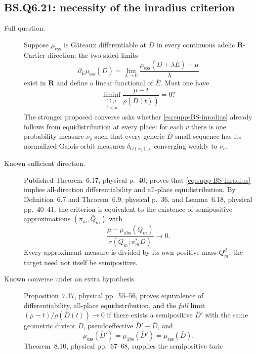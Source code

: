 \documentclass[11pt,a4paper]{article}
\theoremstyle{definition}
\theoremstyle{remark}
\begin{document}
\subsection*{BS.Q6.21: necessity of the inradius criterion}
\label{supp:BS-Q621}
\begin{description}
\item[Full question.]
Suppose $\mu_{\mathrm{ess}}$ is G\^ateaux differentiable at
$\overline D$ in every continuous adelic $\mathbf R$-Cartier direction:
the two-sided limits
\[
 \partial_{\overline E}\mu_{\mathrm{ess}}(\overline D)
   =\lim_{\lambda\to0}
       \frac{\mu_{\mathrm{ess}}(\overline D+\lambda\overline E)-\mu}{\lambda}
\]
exist in $\mathbf R$ and define a linear functional of $\overline E$.
Must one have
\begin{equation}\label{eq:supp-BS-inradius}
 \liminf_{\substack{t\uparrow\mu\\t<\mu}}
       \frac{\mu-t}{\rho(\overline D(t))}=0?
\end{equation}
The stronger proposed converse asks whether \eqref{eq:supp-BS-inradius}
already follows from equidistribution at every place: for each $v$ there
is one probability measure $\nu_v$ such that every generic
$\overline D$-small sequence has its normalized Galois-orbit measures
$\delta_{O(x_\ell),v}$ converging weakly to $\nu_v$.
\item[Known sufficient direction.]
Published Theorem~6.17, physical p.~40, proves that
\eqref{eq:supp-BS-inradius} implies all-direction differentiability and
all-place equidistribution. By Definition~6.7 and Theorem~6.9,
physical p.~36, and Lemma~6.18, physical pp.~40--41, the criterion is
equivalent to the existence of semipositive approximations
$(\pi_m,\overline Q_m)$ with
\[
 \frac{\mu-\mu_{\mathrm{abs}}(\overline Q_m)}
      {r(Q_m;\pi_m^*D)}\longrightarrow0.
\]
Every approximant measure is divided by its own positive mass $Q_m^d$;
the target need not itself be semipositive.
\item[Known converse under an extra hypothesis.]
Proposition~7.17, physical pp.~55--56, proves equivalence of
differentiability, all-place equidistribution, and the \emph{full} limit
$(\mu-t)/\rho(\overline D(t))\to0$ if there exists a semipositive
$\overline D'$ with the same geometric divisor $D$, pseudoeffective
$\overline D'-\overline D$, and
\[
 \mu_{\mathrm{ess}}(\overline D')
 =\mu_{\mathrm{abs}}(\overline D')
 =\mu_{\mathrm{ess}}(\overline D).
\]
Theorem~8.10, physical pp.~67--68, supplies the semipositive toric

\end{description}
\end{document}
